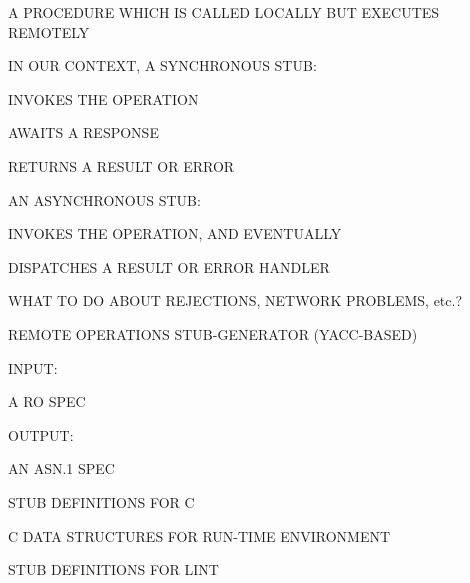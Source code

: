\begin{bwslide}

\begin{nrtc}
\item	A PROCEDURE WHICH IS CALLED LOCALLY BUT EXECUTES REMOTELY

\item	IN OUR CONTEXT, A SYNCHRONOUS STUB:
    \begin{nrtc}
    \item	INVOKES THE OPERATION

    \item	AWAITS A RESPONSE

    \item	RETURNS A RESULT OR ERROR
    \end{nrtc}

\item	AN ASYNCHRONOUS STUB:
    \begin{nrtc}
    \item	INVOKES THE OPERATION, AND EVENTUALLY

    \item	DISPATCHES A RESULT OR ERROR HANDLER
    \end{nrtc}

\item	WHAT TO DO ABOUT REJECTIONS, NETWORK PROBLEMS, etc.?
\end{nrtc}
\end{bwslide}


\begin{bwslide}

\begin{nrtc}
\item	REMOTE OPERATIONS STUB-GENERATOR (YACC-BASED)

\item	INPUT:
    \begin{nrtc}
    \item	A RO SPEC
    \end{nrtc}

\item	OUTPUT:
    \begin{nrtc}
    \item	AN ASN.1 SPEC

    \item	STUB DEFINITIONS FOR C

    \item	C DATA STRUCTURES FOR RUN-TIME ENVIRONMENT

    \item	STUB DEFINITIONS FOR LINT
    \end{nrtc}
\end{nrtc}
\end{bwslide}


